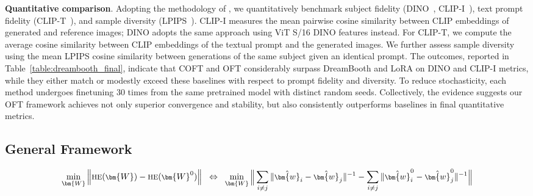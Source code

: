 \begin{itemize}[leftmargin=*,nosep]

\textbf{Quantitative comparison}. Adopting the methodology of \cite{ruiz2023dreambooth}, we quantitatively benchmark subject fidelity (DINO~\cite{caron2021emerging}, CLIP-I~\cite{radford2021learning}), text prompt fidelity (CLIP-T~\cite{radford2021learning}), and sample diversity (LPIPS~\cite{zhang2018unreasonable}). CLIP-I measures the mean pairwise cosine similarity between CLIP embeddings of generated and reference images; DINO adopts the same approach using ViT S/16 DINO features instead. For CLIP-T, we compute the average cosine similarity between CLIP embeddings of the textual prompt and the generated images. We further assess sample diversity using the mean LPIPS cosine similarity between generations of the same subject given an identical prompt. The outcomes, reported in Table~\ref{table:dreambooth_final}, indicate that COFT and OFT considerably surpass DreamBooth and LoRA on DINO and CLIP-I metrics, while they either match or modestly exceed these baselines with respect to prompt fidelity and diversity. To reduce stochasticity, each method undergoes finetuning 30 times from the same pretrained model with distinct random seeds. Collectively, the evidence suggests our OFT framework achieves not only superior convergence and stability, but also consistently outperforms baselines in final quantitative metrics.

\subsection{General Framework}

\begin{equation}\label{eq:oft_principle}
\footnotesize
\min_{\bm{W}} \left\| \text{HE}(\bm{W})-\text{HE}(\bm{W}^0)\right\|~~\Leftrightarrow~~\min_{\bm{W}} \bigg{\|} \sum_{i\neq j} \|\hat{\bm{w}}_i-\hat{\bm{w}}_j\|^{-1}-\sum_{i\neq j} \|\hat{\bm{w}}^0_i-\hat{\bm{w}}^0_j\|^{-1}\bigg{\|}
\end{equation}


\end{itemize}
